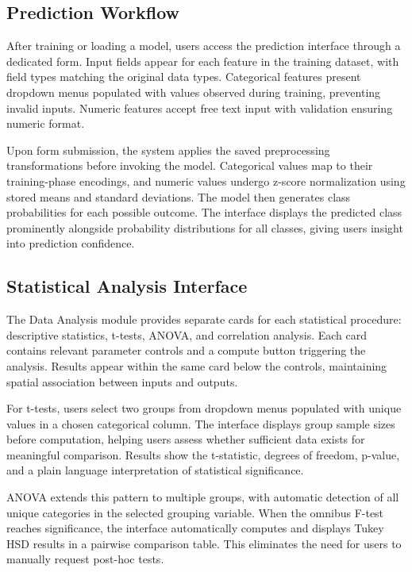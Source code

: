 \documentclass[conference]{IEEEtran}
\begin{document}
\subsection{Prediction Workflow}

After training or loading a model, users access the prediction interface through a dedicated form. Input fields appear for each feature in the training dataset, with field types matching the original data types. Categorical features present dropdown menus populated with values observed during training, preventing invalid inputs. Numeric features accept free text input with validation ensuring numeric format.

Upon form submission, the system applies the saved preprocessing transformations before invoking the model. Categorical values map to their training-phase encodings, and numeric values undergo z-score normalization using stored means and standard deviations. The model then generates class probabilities for each possible outcome. The interface displays the predicted class prominently alongside probability distributions for all classes, giving users insight into prediction confidence.

\subsection{Statistical Analysis Interface}

The Data Analysis module provides separate cards for each statistical procedure: descriptive statistics, t-tests, ANOVA, and correlation analysis. Each card contains relevant parameter controls and a compute button triggering the analysis. Results appear within the same card below the controls, maintaining spatial association between inputs and outputs.

For t-tests, users select two groups from dropdown menus populated with unique values in a chosen categorical column. The interface displays group sample sizes before computation, helping users assess whether sufficient data exists for meaningful comparison. Results show the t-statistic, degrees of freedom, p-value, and a plain language interpretation of statistical significance.

ANOVA extends this pattern to multiple groups, with automatic detection of all unique categories in the selected grouping variable. When the omnibus F-test reaches significance, the interface automatically computes and displays Tukey HSD results in a pairwise comparison table. This eliminates the need for users to manually request post-hoc tests.
\end{document}
